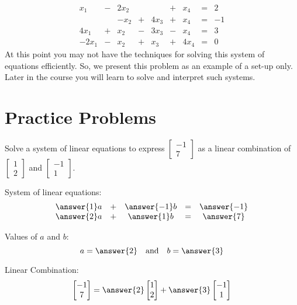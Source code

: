 \documentclass{ximera}
\begin{document}
\begin{example}
\begin{explanation}
$$\begin{array}{ccccccccc}
      x_1 & -&2x_2 & & &+ & x_4&= &2 \\
        & &-x_2  &+ &4x_3 & +& x_4&= &-1 \\
      4x_1 &+ &x_2 & -&3x_3 &-&x_4&= &3\\
	 -2x_1& -&x_2 & +&x_3&+&4x_4&=&0
    \end{array}$$
    At this point you may not have the techniques for solving this system of equations efficiently.  So, we present this problem as an example of a set-up only.  Later in the course you will learn to solve and interpret such systems.
\end{explanation}
\end{example}




\section*{Practice Problems}
\begin{problem}
Solve a system of linear equations to express $\begin{bmatrix}-1\\7\end{bmatrix}$ as a linear combination of $\begin{bmatrix}1\\2\end{bmatrix}$ and $\begin{bmatrix}-1\\1\end{bmatrix}$.

System of linear equations:
$$\begin{array}{ccccc}
      \answer{1}a & +&\answer{-1}b&= &\answer{-1} \\
	 \answer{2}a& +&\answer{1}b&=&\answer{7}
    \end{array}$$
    
    Values of $a$ and $b$:
    $$a=\answer{2}\quad\text{and}\quad b=\answer{3}$$
    
    Linear Combination:
    $$\begin{bmatrix}-1\\7\end{bmatrix}=\answer{2}\begin{bmatrix}1\\2\end{bmatrix}+\answer{3}\begin{bmatrix}-1\\1\end{bmatrix}$$

\end{problem}
\end{document}
